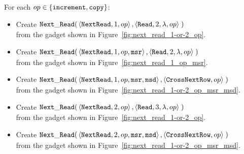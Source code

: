 For each $op\in \{ {\tt increment}, {\tt copy} \}$:
\begin{itemize}

    \item Create
    $\begin{aligned}[t]
        {\tt Next\_Read}(& \left\langle {\tt NextRead}, 1,          op \right\rangle,
                    \left\langle {\tt Read},     2, \lambda, op \right\rangle \;)
    \end{aligned}$\\from the gadget shown in Figure~\ref{fig:next_read_1-or-2_op}.

    \item Create
    $\begin{aligned}[t]
        {\tt Next\_Read}(& \left\langle {\tt NextRead}, 1,          op, {\tt msr} \right\rangle,
                    \left\langle {\tt Read},     2, \lambda, op            \right\rangle \;)
    \end{aligned}$\\from the gadget shown in Figure~\ref{fig:next_read_1_op_msr}.

    \item Create
    $\begin{aligned}[t]
        {\tt Next\_Read}(& \left\langle {\tt NextRead}, 1,  op, {\tt msr}, {\tt msd} \right\rangle,
                    \left\langle {\tt CrossNextRow}, op                       \right\rangle \;)
    \end{aligned}$\\from the gadget shown in Figure~\ref{fig:next_read_1-or-2_op_msr_msd}.


    \item Create
    $\begin{aligned}[t]
        {\tt Next\_Read}(& \left\langle {\tt NextRead}, 2,          op \right\rangle,
                    \left\langle {\tt Read},     3, \lambda, op \right\rangle \;)
    \end{aligned}$\\from the gadget shown in Figure~\ref{fig:next_read_1-or-2_op}.

    \item Create
    $\begin{aligned}[t]
        {\tt Next\_Read}(& \left\langle {\tt NextRead}, 2,  op, {\tt msr}, {\tt msd} \right\rangle,
                    \left\langle {\tt CrossNextRow}, op                       \right\rangle \;)
    \end{aligned}$\\from the gadget shown in Figure~\ref{fig:next_read_1-or-2_op_msr_msd}.



\end{itemize}
